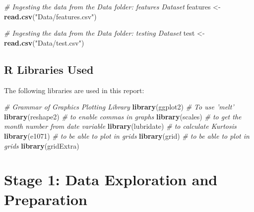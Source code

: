 \documentclass[]{article}
\newenvironment{Shaded}{\begin{snugshade}}{\end{snugshade}}
\newcommand{\KeywordTok}[1]{\textcolor[rgb]{0.13,0.29,0.53}{\textbf{{#1}}}}
\newcommand{\StringTok}[1]{\textcolor[rgb]{0.31,0.60,0.02}{{#1}}}
\newcommand{\CommentTok}[1]{\textcolor[rgb]{0.56,0.35,0.01}{\textit{{#1}}}}
\newcommand{\NormalTok}[1]{{#1}}
\begin{document}
\begin{Shaded}
\begin{Highlighting}[]
\CommentTok{# Ingesting the data from the Data folder: features Dataset}
\NormalTok{features <-}\StringTok{ }\KeywordTok{read.csv}\NormalTok{(}\StringTok{"Data/features.csv"}\NormalTok{)}
\end{Highlighting}
\end{Shaded}

\begin{Shaded}
\begin{Highlighting}[]
\CommentTok{# Ingesting the data from the Data folder: testing Dataset}
\NormalTok{test <-}\StringTok{ }\KeywordTok{read.csv}\NormalTok{(}\StringTok{"Data/test.csv"}\NormalTok{)}
\end{Highlighting}
\end{Shaded}

\subsection{R Libraries Used}\label{r-libraries-used}

The following libraries are used in this report:

\begin{Shaded}
\begin{Highlighting}[]
\CommentTok{# Grammar of Graphics Plotting Library}
\KeywordTok{library}\NormalTok{(ggplot2)}
\CommentTok{# To use 'melt'}
\KeywordTok{library}\NormalTok{(reshape2)}
\CommentTok{# to enable commas in graphs}
\KeywordTok{library}\NormalTok{(scales)}
\CommentTok{# to get the month number from date variable}
\KeywordTok{library}\NormalTok{(lubridate)}
\CommentTok{# to calculate Kurtosis}
\KeywordTok{library}\NormalTok{(e1071)}
\CommentTok{# to be able to plot in grids}
\KeywordTok{library}\NormalTok{(grid)}
\CommentTok{# to be able to plot in grids}
\KeywordTok{library}\NormalTok{(gridExtra)}
\end{Highlighting}
\end{Shaded}

\pagebreak
\hfill \break
\hfill \break
\hfill \break
\hfill \break
\hfill \break
\hfill \break
\hfill \break
\hfill \break
\hfill \break
\hfill \break
\hfill \break
\hfill \break
\hfill \break
\hfill \break
\hfill \break
\hfill \break
\hfill \break
\hfill \break
\hfill \break
\hfill \break

\section{Stage 1: Data Exploration and
Preparation}\label{stage-1-data-exploration-and-preparation}
\end{document}
